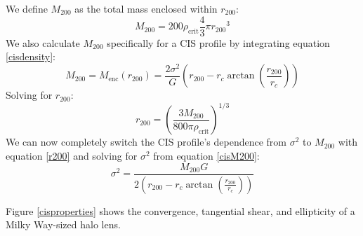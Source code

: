 \documentclass[10pt]{article}
\begin{document}
We define $M_{200}$ as the total mass enclosed within $r_{200}$:
\begin{equation} \label{M200}
M_{200} = 200 \rho_\mathrm{crit} \frac{4}{3} \pi {r_{200}}^3
\end{equation}
We also calculate $M_{200}$ specifically for a CIS profile by integrating equation \ref{cisdensity}:
\begin{equation} \label{cisM200}
M_{200} = M_\mathrm{enc}(r_{200}) = \frac{2 \sigma^2}{G} \left( r_{200} - r_c \arctan{\left(\frac{r_{200}}{r_c}\right)} \right)
\end{equation}
Solving for $r_{200}$:
\begin{equation} \label{r200}
r_{200} = \left( \frac{3 M_{200}}{800 \pi \rho_\mathrm{crit}} \right)^{1/3}
\end{equation}
We can now completely switch the CIS profile's dependence from $\sigma^2$ to $M_{200}$ with equation \ref{r200} and solving for $\sigma^2$ from equation \ref{cisM200}:
\begin{equation}
\sigma^2 = \frac{M_{200} G}{2 \left( r_{200} - r_c \arctan{\left(\frac{r_{200}}{r_c}\right)} \right)}
\end{equation}

Figure \ref{cisproperties} shows the convergence, tangential shear, and ellipticity of a Milky Way-sized halo lens.
\end{document}
